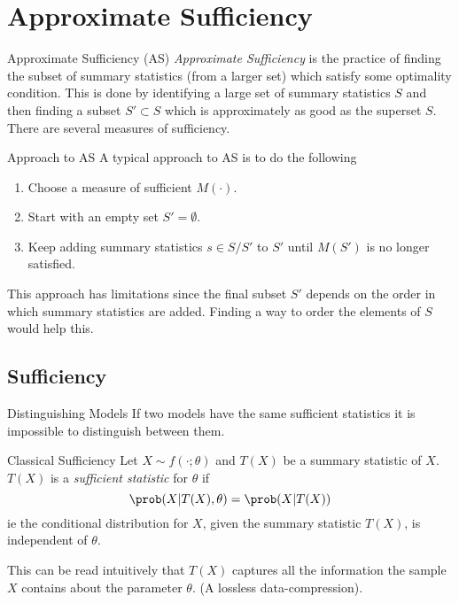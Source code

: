 \documentclass[11pt,a4paper]{article}
\begin{document}
\section*{Approximate Sufficiency}

  \begin{proposition}{Approximate Sufficiency (AS)}
    \textit{Approximate Sufficiency} is the practice of finding the subset of summary statistics (from a larger set) which satisfy some optimality condition. This is done by identifying a large set of summary statistics $S$ and then finding a subset $S'\subset S$ which is approximately as good as the superset $S$. There are several measures of sufficiency.
  \end{proposition}

  \begin{proposition}{Approach to AS}
    A typical approach to AS is to do the following
    \begin{enumerate}
      \item Choose a measure of sufficient $M(\cdot)$.
      \item Start with an empty set $S'=\emptyset$.
      \item Keep adding summary statistics $s\in S/S'$ to $S'$ until $M(S')$ is no longer satisfied.
    \end{enumerate}
    This approach has limitations since the final subset $S'$ depends on the order in which summary statistics are added. Finding a way to order the elements of $S$ would help this.
  \end{proposition}

\subsection*{Sufficiency}

  \begin{remark}{Distinguishing Models}
    If two models have the same sufficient statistics it is impossible to distinguish between them.
  \end{remark}

  \begin{definition}{Classical Sufficiency}
    Let $X\sim f(\cdot;\theta)$ and $T(X)$ be a summary statistic of $X$. $T(X)$ is a \textit{sufficient statistic} for $\theta$ if
    \[ \prob(X|T(X),\theta)=\prob(X|T(X)) \]
    ie the conditional distribution for $X$, given the summary statistic $T(X)$, is independent of $\theta$.
    \par This can be read intuitively that $T(X)$ captures all the information the sample $X$ contains about the parameter $\theta$. (A lossless data-compression).
  \end{definition}
\end{document}
